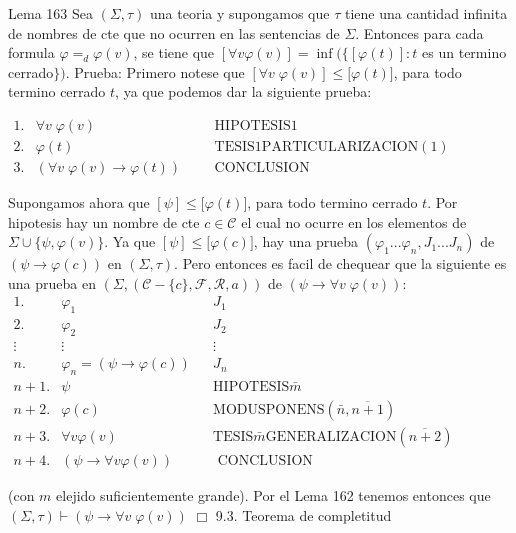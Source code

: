 Lema 163 Sea \((\Sigma ,\tau )\) una teoria y supongamos que \( \tau \) tiene una cantidad infinita de nombres de cte que no ocurren en las sentencias de \(\Sigma \). Entonces para cada formula \(\varphi =_{d}\varphi (v) \), se tiene que \([\forall v\varphi (v)]=\inf (\{[\varphi (t)]:t\) es un termino cerrado\(\})\).
Prueba: Primero notese que \([\forall v\;\varphi (v)]\leq \lbrack \varphi (t)]\), para todo termino cerrado \(t\), ya que podemos dar la siguiente prueba:

\(\displaystyle \begin{array}{cllll} 1. & \forall v\;\varphi (v) & & & \text{HIPOTESIS}1 \\ 2. & \varphi (t) & & & \text{TESIS}1\text{PARTICULARIZACION}(1) \\ 3. & (\forall v\;\varphi (v)\rightarrow \varphi (t)) & & & \text{CONCLUSION } \end{array} \)

Supongamos ahora que \([\psi ]\leq \lbrack \varphi (t)]\), para todo termino cerrado \(t.\) Por hipotesis hay un nombre de cte \(c\in \mathcal{C}\) el cual no ocurre en los elementos de \(\Sigma \cup \{\psi ,\varphi (v)\}.\) Ya que \( [\psi ]\leq \lbrack \varphi (c)]\), hay una prueba \((\varphi _{1}...\varphi _{n},J_{1}...J_{n})\) de \(\left( \psi \rightarrow \varphi (c)\right) \) en \( (\Sigma ,\tau )\). Pero entonces es facil de chequear que la siguiente es una prueba en \((\Sigma ,(\mathcal{C}-\{c\},\mathcal{F},\mathcal{R},a))\) de \( \left( \psi \rightarrow \forall v\;\varphi (v)\right) \):
\(\displaystyle \begin{array}{rlcl} 1. & \varphi _{1} & & J_{1} \\ 2. & \varphi _{2} & & J_{2} \\ \vdots & \vdots & & \vdots \\ n. & \varphi _{n}=\left( \psi \rightarrow \varphi (c)\right) & & J_{n} \\ n+1. & \psi & & \text{HIPOTESIS}\bar{m} \\ n+2. & \varphi (c) & & \text{MODUSPONENS}(\bar{n},\overline{n+1}) \\ n+3. & \forall v\varphi (v) & & \text{TESIS}\bar{m}\text{GENERALIZACION}( \overline{n+2}) \\ n+4. & \left( \psi \rightarrow \forall v\varphi (v)\right) & & \text{ CONCLUSION} \end{array} \)

(con \(m\) elejido suficientemente grande). Por el Lema 162 tenemos entonces que \((\Sigma ,\tau )\vdash \left( \psi \rightarrow \forall v\;\varphi (v)\right) \) \(\Box\)
9.3. Teorema de completitud

